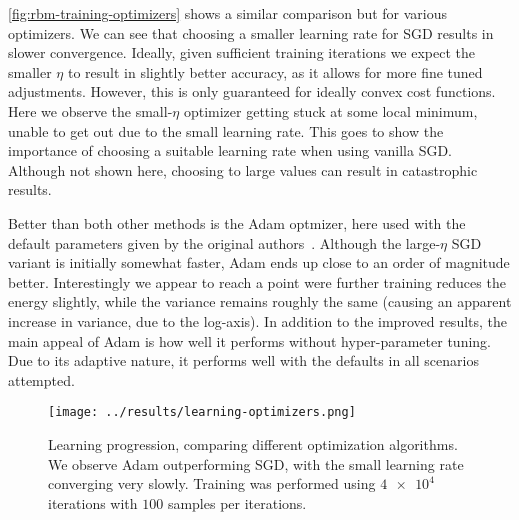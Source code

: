 \documentclass[a4paper, 11pt]{article}
\begin{document}
\begin{multicols}{2}

    \autoref{fig:rbm-training-optimizers} shows a similar comparison but for
    various optimizers. We can see that choosing a smaller learning rate for SGD
    results in slower convergence. Ideally, given sufficient training iterations
    we expect the smaller $\eta$ to result in slightly better accuracy, as it
    allows for more fine tuned adjustments. However, this is only guaranteed for
    ideally convex cost functions. Here we observe the small-$\eta$ optimizer
    getting stuck at some local minimum, unable to get out due to the small
    learning rate. This goes to show the importance of choosing a suitable
    learning rate when using vanilla SGD. Although not shown here, choosing to
    large values can result in catastrophic results.

    Better than both other methods is the Adam optmizer, here used with the
    default parameters given by the original authors~\cite{KingmaB14}. Although
    the large-$\eta$ SGD variant is initially somewhat faster, Adam ends up
    close to an order of magnitude better. Interestingly we appear to reach a
    point were further training reduces the energy slightly, while the variance
    remains roughly the same (causing an apparent increase in variance, due to
    the log-axis). In addition to the improved results, the main appeal of Adam
    is how well it performs without hyper-parameter tuning. Due to its adaptive
    nature, it performs well with the defaults in all scenarios attempted.
\end{multicols}

\begin{figure}[ht]
    \centering
    \texttt{[image: ../results/learning-optimizers.png]}
    \caption{Learning progression, comparing different optimization algorithms.
    We observe Adam outperforming SGD, with the small learning rate converging
    very slowly. Training was performed using $\num{4e4}$ iterations with $100$
    samples per iterations.}
    \label{fig:rbm-training-optimizers}
\end{figure}
\end{document}
